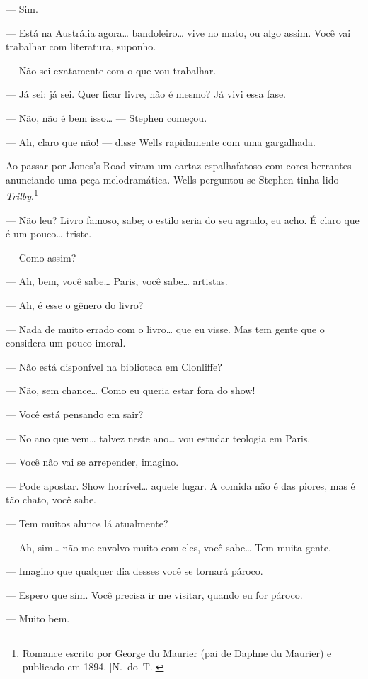 --- Sim.

--- Está na Austrália agora\ldots{} bandoleiro\ldots{} vive no mato, ou
algo assim.  Você vai trabalhar com literatura, suponho.

--- Não sei exatamente com o que vou trabalhar.

--- Já sei: já sei.  Quer ficar livre, não é mesmo?  \label{ja"-vivi} Já vivi
essa fase.

--- Não, não é bem isso\ldots{} --- Stephen começou.

--- Ah, claro que não! --- disse Wells rapidamente com uma
gargalhada.

Ao passar por Jones’s Road viram um cartaz espalhafatoso com cores
berrantes anunciando uma peça melodramática.  Wells perguntou se
Stephen tinha lido \textit{Trilby}.\footnote[\setcounter{symbol}{2}]{ Romance escrito por
George du Maurier (pai de Daphne du Maurier) e publicado em 1894. [N.~do~T.]}

--- Não leu?  Livro famoso, sabe; o estilo seria do seu agrado,
eu acho.  É claro que é um pouco\ldots{} triste.

--- Como assim?

--- Ah, bem, você sabe\ldots{} Paris, você sabe\ldots{} artistas.

--- Ah, é esse o gênero do livro?

--- Nada de muito errado com o livro\ldots{} que eu visse.  Mas tem
gente que o considera um pouco imoral.

--- Não está disponível na biblioteca em Clonliffe?

--- Não, sem chance\ldots{}  Como eu queria estar fora do show!		

--- Você está pensando em sair?

--- No ano que vem\ldots{} talvez neste ano\ldots{} vou estudar teologia em
Paris.

--- Você não vai se arrepender, imagino.

--- Pode apostar.  Show horrível\ldots{} aquele lugar.  A comida não é		
das piores, mas é tão chato, você sabe.

--- Tem muitos alunos lá atualmente?

--- Ah, sim\ldots{} não me envolvo muito com eles, você sabe\ldots{} Tem
muita gente.

--- Imagino que qualquer dia desses você se tornará pároco.

--- Espero que sim.  Você precisa ir me visitar, quando eu for
pároco.

--- Muito bem.

